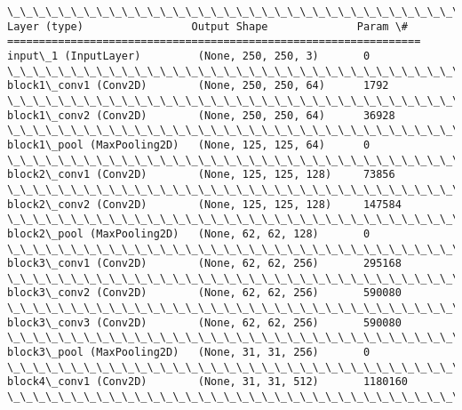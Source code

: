 \documentclass[11pt]{article}
\begin{document}
    \begin{Verbatim}[commandchars=\\\{\},fontsize=\footnotesize]
\_\_\_\_\_\_\_\_\_\_\_\_\_\_\_\_\_\_\_\_\_\_\_\_\_\_\_\_\_\_\_\_\_\_\_\_\_\_\_\_\_\_\_\_\_\_\_\_\_\_\_\_\_\_\_\_\_\_\_\_\_\_\_\_\_
Layer (type)                 Output Shape              Param \#
=================================================================
input\_1 (InputLayer)         (None, 250, 250, 3)       0
\_\_\_\_\_\_\_\_\_\_\_\_\_\_\_\_\_\_\_\_\_\_\_\_\_\_\_\_\_\_\_\_\_\_\_\_\_\_\_\_\_\_\_\_\_\_\_\_\_\_\_\_\_\_\_\_\_\_\_\_\_\_\_\_\_
block1\_conv1 (Conv2D)        (None, 250, 250, 64)      1792
\_\_\_\_\_\_\_\_\_\_\_\_\_\_\_\_\_\_\_\_\_\_\_\_\_\_\_\_\_\_\_\_\_\_\_\_\_\_\_\_\_\_\_\_\_\_\_\_\_\_\_\_\_\_\_\_\_\_\_\_\_\_\_\_\_
block1\_conv2 (Conv2D)        (None, 250, 250, 64)      36928
\_\_\_\_\_\_\_\_\_\_\_\_\_\_\_\_\_\_\_\_\_\_\_\_\_\_\_\_\_\_\_\_\_\_\_\_\_\_\_\_\_\_\_\_\_\_\_\_\_\_\_\_\_\_\_\_\_\_\_\_\_\_\_\_\_
block1\_pool (MaxPooling2D)   (None, 125, 125, 64)      0
\_\_\_\_\_\_\_\_\_\_\_\_\_\_\_\_\_\_\_\_\_\_\_\_\_\_\_\_\_\_\_\_\_\_\_\_\_\_\_\_\_\_\_\_\_\_\_\_\_\_\_\_\_\_\_\_\_\_\_\_\_\_\_\_\_
block2\_conv1 (Conv2D)        (None, 125, 125, 128)     73856
\_\_\_\_\_\_\_\_\_\_\_\_\_\_\_\_\_\_\_\_\_\_\_\_\_\_\_\_\_\_\_\_\_\_\_\_\_\_\_\_\_\_\_\_\_\_\_\_\_\_\_\_\_\_\_\_\_\_\_\_\_\_\_\_\_
block2\_conv2 (Conv2D)        (None, 125, 125, 128)     147584
\_\_\_\_\_\_\_\_\_\_\_\_\_\_\_\_\_\_\_\_\_\_\_\_\_\_\_\_\_\_\_\_\_\_\_\_\_\_\_\_\_\_\_\_\_\_\_\_\_\_\_\_\_\_\_\_\_\_\_\_\_\_\_\_\_
block2\_pool (MaxPooling2D)   (None, 62, 62, 128)       0
\_\_\_\_\_\_\_\_\_\_\_\_\_\_\_\_\_\_\_\_\_\_\_\_\_\_\_\_\_\_\_\_\_\_\_\_\_\_\_\_\_\_\_\_\_\_\_\_\_\_\_\_\_\_\_\_\_\_\_\_\_\_\_\_\_
block3\_conv1 (Conv2D)        (None, 62, 62, 256)       295168
\_\_\_\_\_\_\_\_\_\_\_\_\_\_\_\_\_\_\_\_\_\_\_\_\_\_\_\_\_\_\_\_\_\_\_\_\_\_\_\_\_\_\_\_\_\_\_\_\_\_\_\_\_\_\_\_\_\_\_\_\_\_\_\_\_
block3\_conv2 (Conv2D)        (None, 62, 62, 256)       590080
\_\_\_\_\_\_\_\_\_\_\_\_\_\_\_\_\_\_\_\_\_\_\_\_\_\_\_\_\_\_\_\_\_\_\_\_\_\_\_\_\_\_\_\_\_\_\_\_\_\_\_\_\_\_\_\_\_\_\_\_\_\_\_\_\_
block3\_conv3 (Conv2D)        (None, 62, 62, 256)       590080
\_\_\_\_\_\_\_\_\_\_\_\_\_\_\_\_\_\_\_\_\_\_\_\_\_\_\_\_\_\_\_\_\_\_\_\_\_\_\_\_\_\_\_\_\_\_\_\_\_\_\_\_\_\_\_\_\_\_\_\_\_\_\_\_\_
block3\_pool (MaxPooling2D)   (None, 31, 31, 256)       0
\_\_\_\_\_\_\_\_\_\_\_\_\_\_\_\_\_\_\_\_\_\_\_\_\_\_\_\_\_\_\_\_\_\_\_\_\_\_\_\_\_\_\_\_\_\_\_\_\_\_\_\_\_\_\_\_\_\_\_\_\_\_\_\_\_
block4\_conv1 (Conv2D)        (None, 31, 31, 512)       1180160
\_\_\_\_\_\_\_\_\_\_\_\_\_\_\_\_\_\_\_\_\_\_\_\_\_\_\_\_\_\_\_\_\_\_\_\_\_\_\_\_\_\_\_\_\_\_\_\_\_\_\_\_\_\_\_\_\_\_\_\_\_\_\_\_\_

\end{Verbatim}
\end{document}
